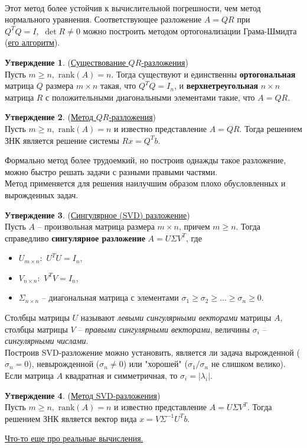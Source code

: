 \documentclass[specialist, subf, href, colorlinks=true, 12pt, times, mtpro, final]{disser}
\theoremstyle{definition}
\newtheorem{state}{Утверждение}[section]
\def\rk{\text{rank}}
\begin{document}
	\\
	Этот метод более устойчив к вычислительной погрешности, чем метод нормального уравнения.
	Соответствующее разложение $A = QR$ при $Q^TQ = I, \,\, \det R \ne 0$ можно построить
	методом ортогонализации Грама-Шмидта (\hyperlink {lects.72}{его алгоритм}).
	\begin{state} (\hyperlink {lects.72}{Существование $QR$-разложения})\\
	Пусть $m \ge n, \,\, \rk(A) = n$. Тогда существуют и единственны {\bf ортогональная}
	матрица $Q$ размера $m\times n$ такая, что $Q^T Q = I_n$, и {\bf верхнетреугольная}
	$n\times n$ матрица $R$ с положительными диагональными элементами такие, что $A=QR$.
	\end{state}
	\begin{state} (\hyperlink {lects.72}{Метод $QR$-разложения})\\
	Пусть $m \ge n, \,\, \rk(A) = n$ и известно представление $A=QR$. Тогда решением ЗНК
	является решение системы $Rx = Q^T b$.
	\end{state}
	Формально метод более трудоемкий, но построив однажды такое разложение, можно быстро
	решать задачи с разными правыми частями.
	\\
	Метод применяется для решения наилучшим образом плохо обусловленных и вырожденных задач.
	\begin{state} (\hyperlink {lects.73}{Сингулярное (SVD) разложение})\\
	Пусть $A$ -- произвольная матрица размера $m\times n$, причем $m \ge n$. Тогда
	справедливо {\bf сингулярное разложение} $A = U\Sigma V^T$, где
	\begin{itemize}
	\item $U_{m\times n}:\,\, U^TU = I_n$,
	\item $V_{n\times n}:\,\, V^TV = I_n$,
	\item $\Sigma_{n\times n}$ -- диагональная матрица с элементами $\sigma_1 \ge \sigma_2
	\ge ... \ge \sigma_n \ge 0$.
	\end{itemize}
	\end{state}
	Столбцы матрицы $U$ называют {\it левыми сингулярными векторами} матрицы $A$, столбцы
	матрицы $V$ --  {\it правыми сингулярными векторами}, величины $\sigma_i$ --
	{\it сингулярными числами}.\\
	Построив SVD-разложение можно установить, является ли задача вырожденной ($\sigma_n=0$),
    невырожденной ($\sigma_n \ne 0$) или "хорошей"{} ($\sigma_1 / \sigma_n$ не слишком
    велико). Если матрица $A$ квадратная и симметричная, то $\sigma_i = |\lambda_i|$.
    \begin{state} (\hyperlink {lects.73}{Метод SVD-разложения})\\
	Пусть $m \ge n, \,\, \rk(A) = n$ и известно представление $A = U\Sigma V^T$.
	Тогда решением ЗНК является вектор вида $x = V\Sigma^{-1}U^T b$.
	\end{state}
	\hyperlink {lects.73}{Что-то еще про реальные вычисления.}
\end{document}
